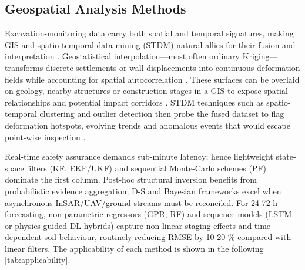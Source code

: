 \documentclass[preprint,11pt,authoryear,3p]{elsarticle}
\begin{document}
\subsection{Geospatial Analysis Methods}

Excavation-monitoring data carry both spatial and temporal signatures, making GIS and spatio-temporal data-mining (STDM) natural allies for their fusion and interpretation \citep{WANG201941}.  Geostatistical interpolation—most often ordinary Kriging—transforms discrete settlements or wall displacements into continuous deformation fields while accounting for spatial autocorrelation \citep{TERRANOVA2015105}.  These surfaces can be overlaid on geology, nearby structures or construction stages in a GIS to expose spatial relationships and potential impact corridors \citep{Spinetti18082019}.  STDM techniques such as spatio-temporal clustering and outlier detection then probe the fused dataset to flag deformation hotspots, evolving trends and anomalous events that would escape point-wise inspection \citep{FESTA20221}.

Real-time safety assurance demands sub-minute latency; hence lightweight state-space filters (KF, EKF/UKF) and sequential Monte-Carlo schemes (PF) dominate the first column.  
Post-hoc structural inversion benefits from probabilistic evidence aggregation; D-S and Bayesian frameworks excel when asynchronous InSAR/UAV/ground streams must be reconciled.
For 24-72 h forecasting, non-parametric regressors (GPR, RF) and sequence models (LSTM or physics-guided DL hybrids) capture non-linear staging effects and time-dependent soil behaviour, routinely reducing RMSE by 10-20 \% compared with linear filters. The applicability of each method is shown in the following \autoref{tab:applicability}.
\end{document}
